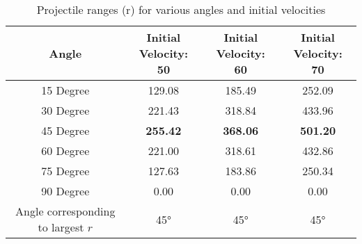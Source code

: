 \documentclass{article}
\begin{document}
\begin{table}[h!]
    \centering
    \begin{tabular}{|c|c|c|c|}
        \hline
        \textbf{Angle} & \makecell{\textbf{Initial Velocity:}\\\textbf{50}} & \makecell{\textbf{Initial Velocity:}\\\textbf{60}} & \makecell{\textbf{Initial Velocity:}\\\textbf{70}} \\
        \hline
        15 Degree & 129.08 & 185.49 & 252.09 \\
        \hline
        30 Degree & 221.43 & 318.84 & 433.96 \\
        \hline
        45 Degree & \textbf{255.42} & \textbf{368.06} & \textbf{501.20} \\
        \hline
        60 Degree & 221.00 & 318.61 & 432.86 \\
        \hline
        75 Degree & 127.63 & 183.86 & 250.34 \\
        \hline
        90 Degree & 0.00 & 0.00 & 0.00 \\
        \hline
        \makecell{Angle corresponding\\to largest $r$} & 45° & 45° & 45° \\
        \hline
    \end{tabular}
    \caption{Projectile ranges (r) for various angles and initial velocities}
    \label{tab:projectile_ranges}
\end{table}
\end{document}

